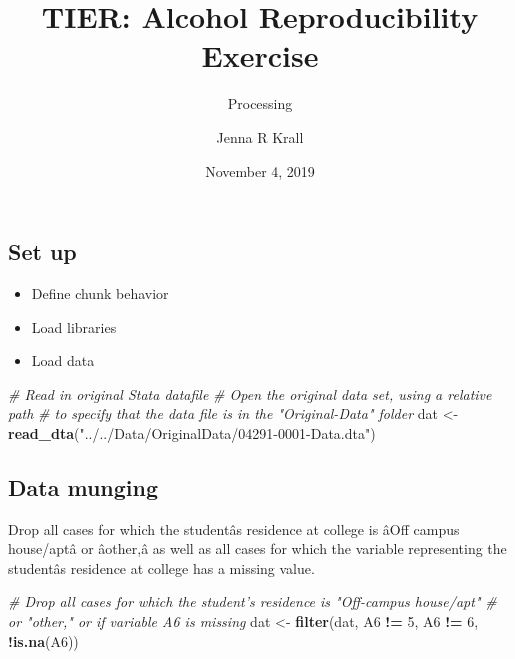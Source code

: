 \documentclass[]{article}
\title{TIER: Alcohol Reproducibility Exercise}
\subtitle{Processing}
\author{Jenna R Krall}
\date{November 4, 2019}
\newenvironment{Shaded}{\begin{snugshade}}{\end{snugshade}}
\newcommand{\CommentTok}[1]{\textcolor[rgb]{0.56,0.35,0.01}{\textit{#1}}}
\newcommand{\DecValTok}[1]{\textcolor[rgb]{0.00,0.00,0.81}{#1}}
\newcommand{\KeywordTok}[1]{\textcolor[rgb]{0.13,0.29,0.53}{\textbf{#1}}}
\newcommand{\NormalTok}[1]{#1}
\newcommand{\OperatorTok}[1]{\textcolor[rgb]{0.81,0.36,0.00}{\textbf{#1}}}
\newcommand{\StringTok}[1]{\textcolor[rgb]{0.31,0.60,0.02}{#1}}
\begin{document}
\maketitle

{
\setcounter{tocdepth}{2}
\tableofcontents
}
\hypertarget{set-up}{%
\subsection{Set up}\label{set-up}}

\begin{itemize}
\item
  Define chunk behavior
\item
  Load libraries
\item
  Load data
\end{itemize}

\begin{Shaded}
\begin{Highlighting}[]
\CommentTok{# Read in original Stata datafile}
\CommentTok{# Open the original data set, using a relative path}
\CommentTok{# to specify that the data file is in the "Original-Data" folder}
\NormalTok{dat <-}\StringTok{ }\KeywordTok{read_dta}\NormalTok{(}\StringTok{"../../Data/OriginalData/04291-0001-Data.dta"}\NormalTok{)}
\end{Highlighting}
\end{Shaded}

\hypertarget{data-munging}{%
\subsection{Data munging}\label{data-munging}}

Drop all cases for which the studentâs residence at college is âOff
campus house/aptâ or âother,â as well as all cases for which the
variable representing the studentâs residence at college has a missing
value.

\begin{Shaded}
\begin{Highlighting}[]
\CommentTok{# Drop all cases for which the student's residence is "Off-campus house/apt"}
\CommentTok{# or "other," or if variable A6 is missing}
\NormalTok{dat <-}\StringTok{ }\KeywordTok{filter}\NormalTok{(dat, A6 }\OperatorTok{!=}\StringTok{ }\DecValTok{5}\NormalTok{, A6 }\OperatorTok{!=}\StringTok{ }\DecValTok{6}\NormalTok{, }\OperatorTok{!}\KeywordTok{is.na}\NormalTok{(A6))}
\end{Highlighting}
\end{Shaded}
\end{document}
